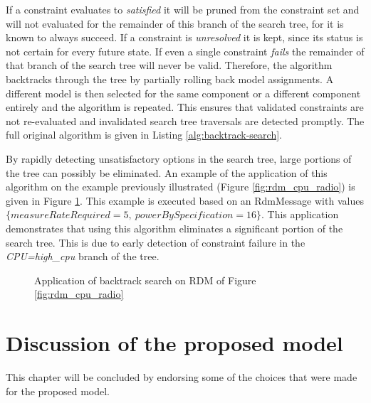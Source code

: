 If a constraint evaluates to \emph{satisfied} it will be pruned from the constraint set and will not evaluated for the remainder of this branch of the search tree, for it is known to always succeed. If a constraint is \emph{unresolved} it is kept, since its status is not certain for every future state. If even a single constraint \emph{fails} the remainder of that branch of the search tree will never be valid. Therefore, the algorithm backtracks through the tree by partially rolling back model assignments. A different model is then selected for the same component or a different component entirely and the algorithm is repeated. This ensures that validated constraints are not re-evaluated and invalidated search tree traversals are detected promptly. The full original algorithm is given in Listing \ref{alg:backtrack-search}. 

By rapidly detecting unsatisfactory options in the search tree, large portions of the tree can possibly be eliminated. An example of the application of this algorithm on the example previously illustrated (Figure \ref{fig:rdm_cpu_radio}) is given in Figure \ref{fig:search_cpu_radio}. This example is executed based on an RdmMessage with values $\{measureRateRequired=5,\ powerBySpecification=16\}$. This application demonstrates that using this algorithm eliminates a significant portion of the search tree. This is due to early detection of constraint failure in the \emph{CPU=high\_cpu} branch of the tree.



\begin{figure}

\caption{Application of backtrack search on RDM of Figure \ref{fig:rdm_cpu_radio}}
\label{fig:search_cpu_radio}
\end{figure}

\section{Discussion of the proposed model}
This chapter will be concluded by endorsing some of the choices that were made for the proposed model. 
